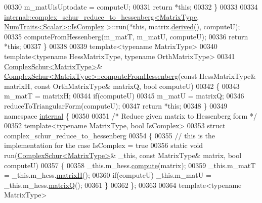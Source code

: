 \begin{DoxyCode}
00330     m\_matUisUptodate = computeU;
00331     \textcolor{keywordflow}{return} *\textcolor{keyword}{this};
00332   \}
00333 
00334   
      \hyperlink{struct_eigen_1_1internal_1_1complex__schur__reduce__to__hessenberg}{internal::complex\_schur\_reduce\_to\_hessenberg<MatrixType, NumTraits<Scalar>::IsComplex}
      >::run(*\textcolor{keyword}{this}, matrix.\hyperlink{group___core___module_a324b16961a11d2ecfd2d1b7dd7946545}{derived}(), computeU);
00335   computeFromHessenberg(m\_matT, m\_matU, computeU);
00336   \textcolor{keywordflow}{return} *\textcolor{keyword}{this};
00337 \}
00338 
00339 \textcolor{keyword}{template}<\textcolor{keyword}{typename} MatrixType>
00340 \textcolor{keyword}{template}<\textcolor{keyword}{typename} HessMatrixType, \textcolor{keyword}{typename} OrthMatrixType>
00341 \hyperlink{group___eigenvalues___module}{ComplexSchur<MatrixType>}& 
      \hyperlink{group___eigenvalues___module_a05dfbf329047aba756a844f8fe2de314}{ComplexSchur<MatrixType>::computeFromHessenberg}(\textcolor{keyword}{const} 
      HessMatrixType& matrixH, \textcolor{keyword}{const} OrthMatrixType& matrixQ, \textcolor{keywordtype}{bool} computeU)
00342 \{
00343   m\_matT = matrixH;
00344   \textcolor{keywordflow}{if}(computeU)
00345     m\_matU = matrixQ;
00346   reduceToTriangularForm(computeU);
00347   \textcolor{keywordflow}{return} *\textcolor{keyword}{this};
00348 \}
00349 \textcolor{keyword}{namespace }\hyperlink{namespaceinternal}{internal} \{
00350 
00351 \textcolor{comment}{/* Reduce given matrix to Hessenberg form */}
00352 \textcolor{keyword}{template}<\textcolor{keyword}{typename} MatrixType, \textcolor{keywordtype}{bool} IsComplex>
00353 \textcolor{keyword}{struct }complex\_schur\_reduce\_to\_hessenberg
00354 \{
00355   \textcolor{comment}{// this is the implementation for the case IsComplex = true}
00356   \textcolor{keyword}{static} \textcolor{keywordtype}{void} run(\hyperlink{group___eigenvalues___module}{ComplexSchur<MatrixType>}& \_this, \textcolor{keyword}{const} MatrixType& matrix, \textcolor{keywordtype}{bool} 
      computeU)
00357   \{
00358     \_this.m\_hess.\hyperlink{group___eigenvalues___module_a239a6fd42c57aab3c0b048c47fde3004}{compute}(matrix);
00359     \_this.m\_matT = \_this.m\_hess.\hyperlink{group___eigenvalues___module_a8e781d2e22a2304647bcf0ae913cc8ea}{matrixH}();
00360     \textcolor{keywordflow}{if}(computeU)  \_this.m\_matU = \_this.m\_hess.\hyperlink{group___eigenvalues___module_a346441e4902a58d43d698ac3da6ff791}{matrixQ}();
00361   \}
00362 \};
00363 
00364 \textcolor{keyword}{template}<\textcolor{keyword}{typename} MatrixType>

\end{DoxyCode}
